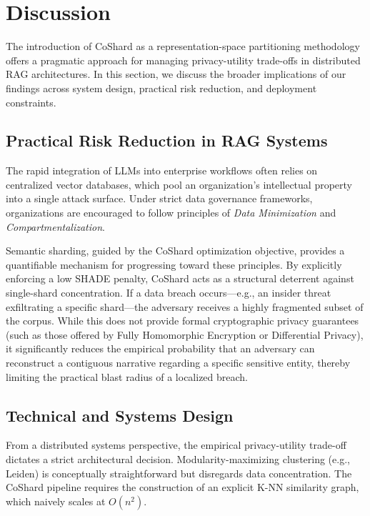 \section{Discussion}
\label{sec:discussion}

The introduction of CoShard as a representation-space partitioning methodology offers a pragmatic approach for managing privacy-utility trade-offs in distributed RAG architectures. In this section, we discuss the broader implications of our findings across system design, practical risk reduction, and deployment constraints.

\subsection{Practical Risk Reduction in RAG Systems}
The rapid integration of LLMs into enterprise workflows often relies on centralized vector databases, which pool an organization's intellectual property into a single attack surface. Under strict data governance frameworks, organizations are encouraged to follow principles of \textit{Data Minimization} and \textit{Compartmentalization}.

Semantic sharding, guided by the CoShard optimization objective, provides a quantifiable mechanism for progressing toward these principles. By explicitly enforcing a low SHADE penalty, CoShard acts as a structural deterrent against single-shard concentration. If a data breach occurs—e.g., an insider threat exfiltrating a specific shard—the adversary receives a highly fragmented subset of the corpus. While this does not provide formal cryptographic privacy guarantees (such as those offered by Fully Homomorphic Encryption or Differential Privacy), it significantly reduces the empirical probability that an adversary can reconstruct a contiguous narrative regarding a specific sensitive entity, thereby limiting the practical blast radius of a localized breach.

\subsection{Technical and Systems Design}
From a distributed systems perspective, the empirical privacy-utility trade-off dictates a strict architectural decision. Modularity-maximizing clustering (e.g., Leiden) is conceptually straightforward but disregards data concentration. The CoShard pipeline requires the construction of an explicit K-NN similarity graph, which naively scales at $O(n^2)$. 

